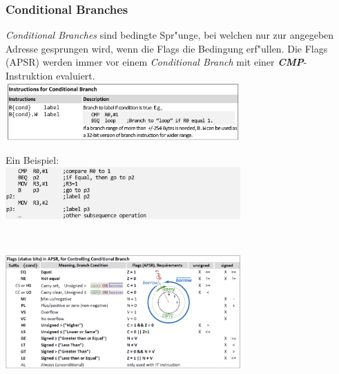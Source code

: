 \begin{minipage}{9cm}
	\subsubsection{Conditional Branches}
	\textit{Conditional Branches} sind bedingte Spr"unge, bei welchen nur zur angegeben Adresse gesprungen wird, wenn die Flags die Bedingung erf"ullen. Die Flags (APSR) werden immer vor einem \textit{Conditional Branch} mit einer \textbf{\textit{CMP}}-Instruktion evaluiert.\\
	
	\includegraphics[width=9cm]{images/Conditional_Branch1}
	
	Ein Beispiel:\\
	
	\includegraphics[width=9cm]{images/Conditional_Branch_Bsp}	
\end{minipage}
%
\begin{minipage}{0.5cm}
	\-\
\end{minipage}
%
\begin{minipage}{9cm}
	\includegraphics[width=9cm]{images/flags_conditional}
\end{minipage}

	




